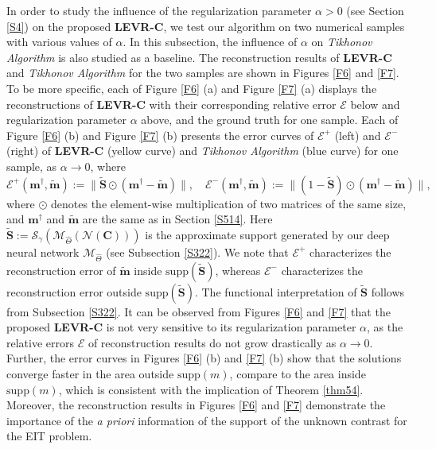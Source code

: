 \documentclass[11pt]{article}
\newcommand{\wit}{\widetilde}
\newcommand{\bds}[1]{\boldsymbol{#1}}
\begin{document}
In order to study the influence of the regularization parameter $\alpha>0$ (see Section \ref{S4}) on the proposed \textbf{LEVR-C}, we test our algorithm on two numerical samples with various values of $ \alpha $.
In this subsection, the influence of $\alpha$ on \textit{Tikhonov Algorithm} is also studied as a baseline.
The reconstruction results of \textbf{LEVR-C} and \textit{Tikhonov Algorithm} for the two samples are shown in Figures \ref{F6} and \ref{F7}.
To be more specific, each of Figure \ref{F6} (a) and Figure \ref{F7} (a) displays the reconstructions of \textbf{LEVR-C} with their corresponding relative error $\mathcal{E}$ below and regularization parameter $ \alpha $ above, and the ground truth for one sample.
Each of Figure \ref{F6} (b) and Figure \ref{F7} (b) presents the error curves of $ \mathcal{E}^+ $ (left) and $ \mathcal{E}^- $ (right) of \textbf{LEVR-C} (yellow curve) and \textit{Tikhonov Algorithm} (blue curve) for one sample, as $ \alpha\to 0 $, where
\begin{equation}\label{65}
\mathcal{E}^+(\bds{m}^\dagger, \wit{\bds{m}}) := \|\widetilde{\bds{S}}\odot(\bds{m}^\dagger-\wit{\bds{m}})\|,\quad \mathcal{E}^-(\bds{m}^\dagger, \wit{\bds{m}}) := \|(1-\widetilde{\bds{S}})\odot(\bds{m}^\dagger-\wit{\bds{m}})\|,
\end{equation}
where $ \odot $ denotes the element-wise multiplication of two matrices of the same size, and $ \bds{m}^\dagger $ and $ \wit{\bds{m}} $ are the same as in Section \ref{S514}.
Here $ \widetilde{\bds{S}} := \mathcal{S}_\gamma(\mathcal{M}_{\widehat{\Theta}}(\mathcal{N}(\bds{C}))) $ is the approximate support generated by our deep neural network $ \mathcal{M}_{\widehat{\Theta}} $ (see Subsection \ref{S322}).
We note that $ \mathcal{E}^+ $ characterizes the reconstruction error of $ \wit{\bds{m}} $ inside $ \mathrm{supp}(\widetilde{\bds{S}}) $, whereas $ \mathcal{E}^- $ characterizes the reconstruction error outside $ \mathrm{supp}(\widetilde{\bds{S}}) $.
The functional interpretation of $ \wit{\bds{S}} $ follows from Subsection \ref{S322}.
It can be observed from Figures \ref{F6} and \ref{F7} that the proposed \textbf{LEVR-C} is not very sensitive to its regularization parameter $\alpha$, as the relative errors $\mathcal{E}$ of reconstruction results do not grow drastically as $ \alpha\to 0 $.
Further, the error curves in Figures \ref{F6} (b) and \ref{F7} (b) show that the solutions converge faster in the area outside $ \mathrm{supp}(m) $, compare to the area inside $ \mathrm{supp}(m) $, which is consistent with the implication of Theorem \ref{thm54}.
Moreover, the reconstruction results in Figures \ref{F6} and \ref{F7} demonstrate the importance of the \textit{a priori} information of the support of the unknown contrast for the EIT problem.
\end{document}
